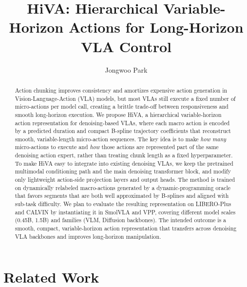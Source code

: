 \documentclass[10pt,twocolumn,letterpaper]{article}
\title{HiVA: Hierarchical Variable-Horizon Actions for Long-Horizon VLA Control}
\author{Jongwoo Park}
\date{}
\begin{document}
\maketitle

\begin{abstract}
Action chunking improves consistency and amortizes expensive action generation in Vision-Language-Action (VLA) models, but most VLAs still execute a fixed number of micro-actions per model call, creating a brittle trade-off between responsiveness and smooth long-horizon execution. We propose HiVA, a hierarchical variable-horizon action representation for denoising-based VLAs, where each macro action is encoded by a predicted duration and compact B-spline trajectory coefficients that reconstruct smooth, variable-length micro-action sequences. The key idea is to make \emph{how many} micro-actions to execute and \emph{how} those actions are represented part of the same denoising action expert, rather than treating chunk length as a fixed hyperparameter. To make HiVA easy to integrate into existing denoising VLAs, we keep the pretrained multimodal conditioning path and the main denoising transformer block, and modify only lightweight action-side projection layers and output heads. The method is trained on dynamically relabeled macro-actions generated by a dynamic-programming oracle that favors segments that are both well approximated by B-splines and aligned with sub-task difficulty. We plan to evaluate the resulting representation on LIBERO-Plus and CALVIN by instantiating it in SmolVLA and VPP, covering different model scales (0.45B, 1.5B) and families (VLM, Diffusion backbones). The intended outcome is a smooth, compact, variable-horizon action representation that transfers across denoising VLA backbones and improves long-horizon manipulation.
\end{abstract}

\section{Related Work}
\end{document}
